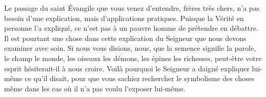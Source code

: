 Le passage du saint Évangile que vous venez d'entendre, frères très chers,
	n'a pas besoin d'une explication, mais d'applications pratiques.
Puisque la Vérité en personne l'a expliqué,
	ce n'est pas à un pauvre homme de prétendre en débattre.
Il est pourtant une chose dans cette explication du Seigneur
		que nous devons examiner avec soin.
Si nous vous disions, nous, que la semence signifie la parole,
		le champ le monde, les oiseaux les démons, les épines les richesses,
	peut-être votre esprit hésiterait-il à nous croire.
Voilà pourquoi le Seigneur a daigné expliquer lui-même ce qu'il disait,
	pour que vous sachiez rechercher le symbolisme des choses
		même dans les cas où il n'a pas voulu l'exposer lui-même.
